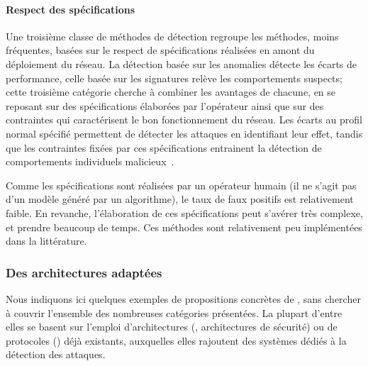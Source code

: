         \paragraph{Respect des spécifications}
Une troisième classe de méthodes de détection regroupe les méthodes, moins fréquentes, basées sur le respect de spécifications réalisées en amont du déploiement du réseau.
La détection basée sur les anomalies détecte les écarts de performance, celle basée sur les signatures relève les comportements suspects; cette troisième catégorie cherche à combiner les avantages de chacune, en se reposant sur des spécifications élaborées par l'opérateur ainsi que sur des contraintes qui caractérisent le bon fonctionnement du réseau.
Les écarts au profil normal spécifié permettent de détecter les attaques en identifiant leur effet, tandis que les contraintes fixées par ces spécifications entrainent la détection de comportements individuels malicieux~\cite{BMS13}.

Comme les spécifications sont réalisées par un opérateur humain (il ne s'agit pas d'un modèle généré par un algorithme), le taux de faux positifs est relativement faible.
En revanche, l'élaboration de ces spécifications peut s'avérer très complexe, et prendre beaucoup de temps.
Ces méthodes sont relativement peu implémentées dans la littérature.

    \subsubsection{Des architectures adaptées}
Nous indiquons ici quelques exemples de propositions concrètes de \idss, sans chercher à couvrir l'ensemble des nombreuses catégories présentées.
La plupart d'entre elles se basent sur l'emploi d'architectures (, architectures de sécurité) ou de protocoles () déjà existants, auxquelles elles rajoutent des systèmes dédiés à la détection des attaques.


